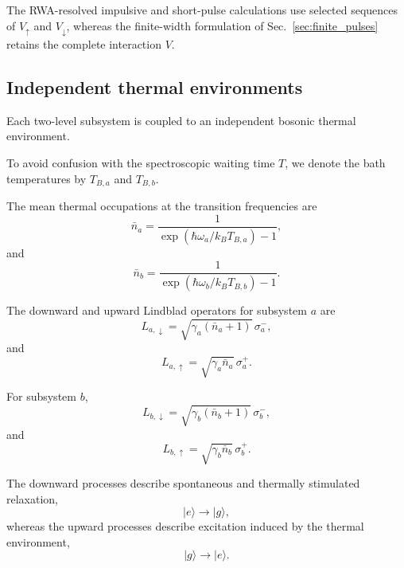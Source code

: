 \documentclass[11pt]{article}
\begin{document}
The RWA-resolved impulsive and short-pulse calculations use selected
sequences of $V_{\uparrow}$ and $V_{\downarrow}$, whereas the
finite-width formulation of Sec.~\ref{sec:finite_pulses} retains the
complete interaction $V$.

\subsection{Independent thermal environments}

Each two-level subsystem is coupled to an independent bosonic thermal
environment.

To avoid confusion with the spectroscopic waiting time $T$, we denote
the bath temperatures by $T_{B,a}$ and $T_{B,b}$.

The mean thermal occupations at the transition frequencies are
%
\begin{equation}
\boxed{
\bar{n}_a
=
\frac{1}{
\exp\left(
\hbar\omega_a/k_B T_{B,a}
\right)
-1
},
}
\label{eq:thermal_occupation_a}
\end{equation}
%
and
%
\begin{equation}
\boxed{
\bar{n}_b
=
\frac{1}{
\exp\left(
\hbar\omega_b/k_B T_{B,b}
\right)
-1
}.
}
\label{eq:thermal_occupation_b}
\end{equation}

The downward and upward Lindblad operators for subsystem $a$ are
%
\begin{equation}
\boxed{
L_{a,\downarrow}
=
\sqrt{
\gamma_a(\bar{n}_a+1)
}
\,\sigma_a^-,
}
\label{eq:thermal_down_a}
\end{equation}
%
and
%
\begin{equation}
\boxed{
L_{a,\uparrow}
=
\sqrt{
\gamma_a\bar{n}_a
}
\,\sigma_a^+.
}
\label{eq:thermal_up_a}
\end{equation}

For subsystem $b$,
%
\begin{equation}
\boxed{
L_{b,\downarrow}
=
\sqrt{
\gamma_b(\bar{n}_b+1)
}
\,\sigma_b^-,
}
\label{eq:thermal_down_b}
\end{equation}
%
and
%
\begin{equation}
\boxed{
L_{b,\uparrow}
=
\sqrt{
\gamma_b\bar{n}_b
}
\,\sigma_b^+.
}
\label{eq:thermal_up_b}
\end{equation}

The downward processes describe spontaneous and thermally stimulated
relaxation,
%
\begin{equation}
|e\rangle
\rightarrow
|g\rangle,
\end{equation}
%
whereas the upward processes describe excitation induced by the thermal
environment,
%
\begin{equation}
|g\rangle
\rightarrow
|e\rangle.
\end{equation}
\end{document}

